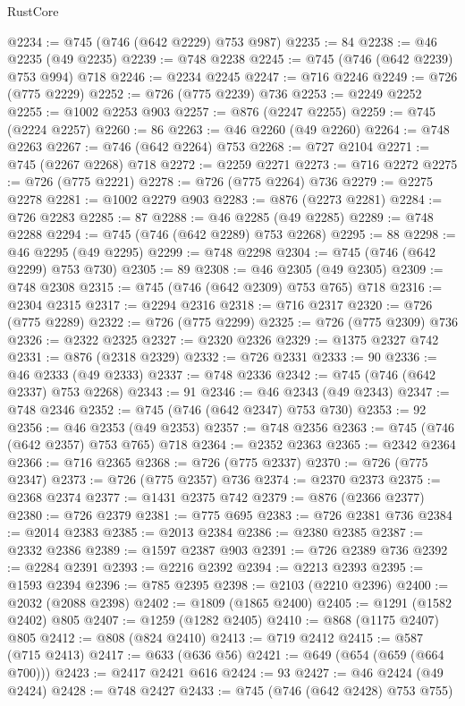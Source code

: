 \begin{lexlean}{RustCore}
\begin{coremodule}
@2234 := @745 (@746 (@642 @2229) @753 @987)
@2235 := 84
@2238 := @46 @2235 (@49 @2235)
@2239 := @748 @2238
@2245 := @745 (@746 (@642 @2239) @753 @994) @718
@2246 := @2234 @2245
@2247 := @716 @2246
@2249 := @726 (@775 @2229)
@2252 := @726 (@775 @2239) @736
@2253 := @2249 @2252
@2255 := @1002 @2253 @903
@2257 := @876 (@2247 @2255)
@2259 := @745 (@2224 @2257)
@2260 := 86
@2263 := @46 @2260 (@49 @2260)
@2264 := @748 @2263
@2267 := @746 (@642 @2264) @753
@2268 := @727 @2104
@2271 := @745 (@2267 @2268) @718
@2272 := @2259 @2271
@2273 := @716 @2272
@2275 := @726 (@775 @2221)
@2278 := @726 (@775 @2264) @736
@2279 := @2275 @2278
@2281 := @1002 @2279 @903
@2283 := @876 (@2273 @2281)
@2284 := @726 @2283
@2285 := 87
@2288 := @46 @2285 (@49 @2285)
@2289 := @748 @2288
@2294 := @745 (@746 (@642 @2289) @753 @2268)
@2295 := 88
@2298 := @46 @2295 (@49 @2295)
@2299 := @748 @2298
@2304 := @745 (@746 (@642 @2299) @753 @730)
@2305 := 89
@2308 := @46 @2305 (@49 @2305)
@2309 := @748 @2308
@2315 := @745 (@746 (@642 @2309) @753 @765) @718
@2316 := @2304 @2315
@2317 := @2294 @2316
@2318 := @716 @2317
@2320 := @726 (@775 @2289)
@2322 := @726 (@775 @2299)
@2325 := @726 (@775 @2309) @736
@2326 := @2322 @2325
@2327 := @2320 @2326
@2329 := @1375 @2327 @742
@2331 := @876 (@2318 @2329)
@2332 := @726 @2331
@2333 := 90
@2336 := @46 @2333 (@49 @2333)
@2337 := @748 @2336
@2342 := @745 (@746 (@642 @2337) @753 @2268)
@2343 := 91
@2346 := @46 @2343 (@49 @2343)
@2347 := @748 @2346
@2352 := @745 (@746 (@642 @2347) @753 @730)
@2353 := 92
@2356 := @46 @2353 (@49 @2353)
@2357 := @748 @2356
@2363 := @745 (@746 (@642 @2357) @753 @765) @718
@2364 := @2352 @2363
@2365 := @2342 @2364
@2366 := @716 @2365
@2368 := @726 (@775 @2337)
@2370 := @726 (@775 @2347)
@2373 := @726 (@775 @2357) @736
@2374 := @2370 @2373
@2375 := @2368 @2374
@2377 := @1431 @2375 @742
@2379 := @876 (@2366 @2377)
@2380 := @726 @2379
@2381 := @775 @695
@2383 := @726 @2381 @736
@2384 := @2014 @2383
@2385 := @2013 @2384
@2386 := @2380 @2385
@2387 := @2332 @2386
@2389 := @1597 @2387 @903
@2391 := @726 @2389 @736
@2392 := @2284 @2391
@2393 := @2216 @2392
@2394 := @2213 @2393
@2395 := @1593 @2394
@2396 := @785 @2395
@2398 := @2103 (@2210 @2396)
@2400 := @2032 (@2088 @2398)
@2402 := @1809 (@1865 @2400)
@2405 := @1291 (@1582 @2402) @805
@2407 := @1259 (@1282 @2405)
@2410 := @868 (@1175 @2407) @805
@2412 := @808 (@824 @2410)
@2413 := @719 @2412
@2415 := @587 (@715 @2413)
@2417 := @633 (@636 @56)
@2421 := @649 (@654 (@659 (@664 @700)))
@2423 := @2417 @2421 @616
@2424 := 93
@2427 := @46 @2424 (@49 @2424)
@2428 := @748 @2427
@2433 := @745 (@746 (@642 @2428) @753 @755)

\end{coremodule}
\end{lexlean}
